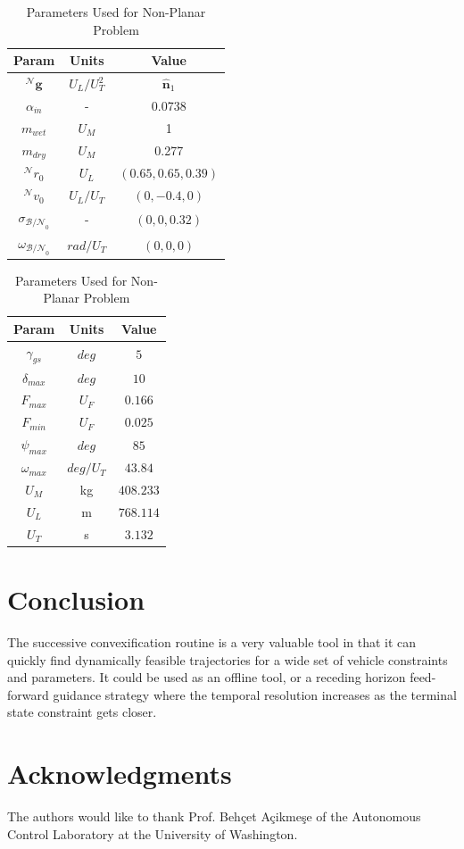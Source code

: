 \documentclass[conf]{new-aiaa}
\begin{document}
\begin{table}[ht]
  \caption{Parameters Used for Non-Planar Problem}
  \centering 
  \begin{tabular}{c c c} 
    \hline\hline
    Param & Units & Value \\ [0.5ex] 
    \hline 
    $^\mathcal{N}\mathbf{g}$ 		& $U_L/U_T^2$ 	& $\hat{\mathbf{n}}_1$  \\ 
    $\alpha_{\dot{m}}$ 				& - 			& 0.0738  \\
    $m_{wet}$ 						& $U_M$ 		& 1  \\
    $m_{dry}$ 						& $U_M$ 		& 0.277  \\
    $^\mathcal{N}r_{0}$ 			& $U_L$ 		& $(0.65,0.65,0.39)$  \\
    $^\mathcal{N}v_{0}$ 			& $U_L/U_T$	 	& $(0,-0.4,0)$  \\
    $\sigma_{\mathcal{B/N}_0}$ 		& - 			& $(0,0,0.32)$  \\
    $\omega_{\mathcal{B/N}_0}$ 		& $rad/U_T$ 	& $(0,0,0)$ \\[1ex] 
    \hline
    \end{tabular}
    \begin{tabular}{c c c} 
    \hline\hline
    Param & Units & Value \\ [0.5ex] 
    \hline 
    $\gamma_{gs}$ 					& $deg$ 		& $5$  \\ 
    $\delta_{max}$	 				& $deg$ 		& $10$  \\
    $F_{max}$ 						& $U_F$ 		& $0.166$ \\
    $F_{min}$ 						& $U_F$ 		& $0.025$  \\
    $\psi_{max}$ 					& $deg$ 		& $85$  \\
    $\omega_{max}$ 					& $deg/U_T$	 	& $43.84$  \\
    $U_M$ 							& kg 			& $408.233$  \\
    $U_L$					 		& m			 	& $768.114$ \\
    $U_T$					 		& s			 	& $3.132$ \\[1ex] 
    \hline
  \end{tabular}
  \label{table:tablenplanar}
\end{table}









\clearpage
\section{Conclusion}
The successive convexification routine is a very valuable tool in that it can quickly find dynamically feasible trajectories for a wide set of vehicle constraints and parameters. It could be used as an offline tool, or a receding horizon feed-forward guidance strategy where the temporal resolution increases as the terminal state constraint gets closer. 

\section*{Acknowledgments}
The authors would like to thank Prof. Behçet Açikmeşe of the Autonomous Control Laboratory at the University of Washington.


\end{document}
